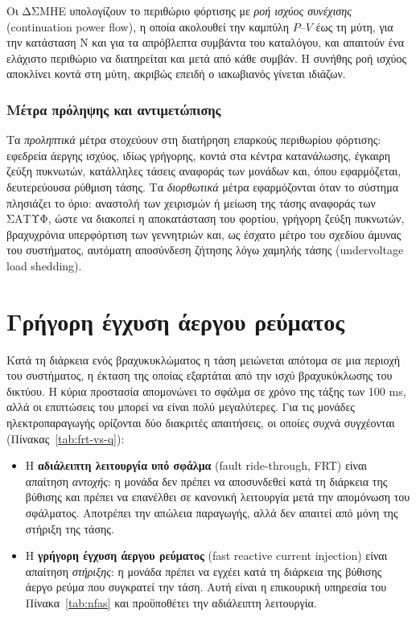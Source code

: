 Οι ΔΣΜΗΕ υπολογίζουν το περιθώριο φόρτισης με \emph{ροή ισχύος συνέχισης} (continuation
power flow), η οποία ακολουθεί την καμπύλη $P$--$V$ έως τη μύτη, για την κατάσταση N και για τα
απρόβλεπτα συμβάντα του καταλόγου, και απαιτούν ένα ελάχιστο περιθώριο να διατηρείται και μετά
από κάθε συμβάν. Η συνήθης ροή ισχύος αποκλίνει κοντά στη μύτη, ακριβώς επειδή ο ιακωβιανός
γίνεται ιδιάζων.

\subsubsection{Μέτρα πρόληψης και αντιμετώπισης}

Τα \emph{προληπτικά} μέτρα στοχεύουν στη διατήρηση επαρκούς περιθωρίου φόρτισης: εφεδρεία
άεργης ισχύος, ιδίως γρήγορης, κοντά στα κέντρα κατανάλωσης, έγκαιρη ζεύξη πυκνωτών, κατάλληλες
τάσεις αναφοράς των μονάδων και, όπου εφαρμόζεται, δευτερεύουσα ρύθμιση τάσης. Τα
\emph{διορθωτικά} μέτρα εφαρμόζονται όταν το σύστημα πλησιάζει το όριο: αναστολή των χειρισμών
ή μείωση της τάσης αναφοράς των ΣΑΤΥΦ, ώστε να διακοπεί η αποκατάσταση του
φορτίου, γρήγορη ζεύξη πυκνωτών, βραχυχρόνια υπερφόρτιση των γεννητριών και, ως έσχατο μέτρο του
σχεδίου άμυνας του συστήματος, αυτόματη αποσύνδεση ζήτησης λόγω χαμηλής τάσης (undervoltage
load shedding).

\section{Γρήγορη έγχυση άεργου ρεύματος}
\label{sec:frt}

Κατά τη διάρκεια ενός βραχυκυκλώματος η τάση μειώνεται απότομα σε μια περιοχή του συστήματος,
η έκταση της οποίας εξαρτάται από την ισχύ βραχυκύκλωσης του δικτύου. Η κύρια προστασία
απομονώνει το σφάλμα σε χρόνο της τάξης των 100 ms, αλλά οι επιπτώσεις του μπορεί να είναι
πολύ μεγαλύτερες. Για τις μονάδες ηλεκτροπαραγωγής ορίζονται δύο διακριτές απαιτήσεις, οι
οποίες συχνά συγχέονται (Πίνακας~\ref{tab:frt-vs-q}):

\begin{itemize}
\item Η \textbf{αδιάλειπτη λειτουργία υπό σφάλμα} (fault ride-through, FRT) είναι
      απαίτηση \emph{αντοχής}: η μονάδα δεν πρέπει να αποσυνδεθεί κατά τη διάρκεια της
      βύθισης και πρέπει να επανέλθει σε κανονική λειτουργία μετά την απομόνωση του σφάλματος.
      Αποτρέπει την απώλεια παραγωγής, αλλά δεν απαιτεί από μόνη της στήριξη της τάσης.
\item Η \textbf{γρήγορη έγχυση άεργου ρεύματος} (fast reactive current injection) είναι
      απαίτηση \emph{στήριξης}: η μονάδα πρέπει να εγχέει κατά τη διάρκεια της βύθισης άεργο
      ρεύμα που συγκρατεί την τάση. Αυτή είναι η επικουρική υπηρεσία του
      Πίνακα~\ref{tab:nfas} και προϋποθέτει την αδιάλειπτη λειτουργία.
\end{itemize}

